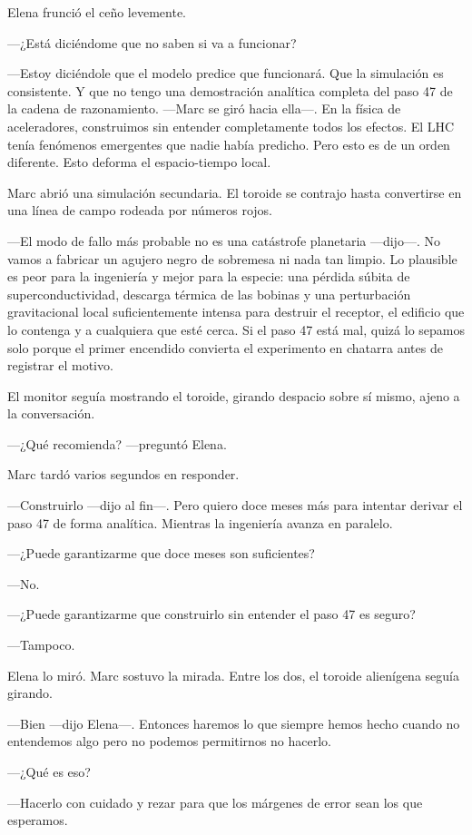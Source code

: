 \documentclass[11pt,a5paper,twoside]{book}
\begin{document}
Elena frunció el ceño levemente.

—¿Está diciéndome que no saben si va a funcionar?

—Estoy diciéndole que el modelo predice que funcionará. Que la simulación es consistente. Y que no tengo una demostración analítica completa del paso 47 de la cadena de razonamiento. —Marc se giró hacia ella—. En la física de aceleradores, construimos sin entender completamente todos los efectos. El LHC tenía fenómenos emergentes que nadie había predicho. Pero esto es de un orden diferente. Esto deforma el espacio-tiempo local.

Marc abrió una simulación secundaria. El toroide se contrajo hasta convertirse en una línea de campo rodeada por números rojos.

—El modo de fallo más probable no es una catástrofe planetaria —dijo—. No vamos a fabricar un agujero negro de sobremesa ni nada tan limpio. Lo plausible es peor para la ingeniería y mejor para la especie: una pérdida súbita de superconductividad, descarga térmica de las bobinas y una perturbación gravitacional local suficientemente intensa para destruir el receptor, el edificio que lo contenga y a cualquiera que esté cerca. Si el paso 47 está mal, quizá lo sepamos solo porque el primer encendido convierta el experimento en chatarra antes de registrar el motivo.

El monitor seguía mostrando el toroide, girando despacio sobre sí mismo, ajeno a la conversación.

—¿Qué recomienda? —preguntó Elena.

Marc tardó varios segundos en responder.

—Construirlo —dijo al fin—. Pero quiero doce meses más para intentar derivar el paso 47 de forma analítica. Mientras la ingeniería avanza en paralelo.

—¿Puede garantizarme que doce meses son suficientes?

—No.

—¿Puede garantizarme que construirlo sin entender el paso 47 es seguro?

—Tampoco.

Elena lo miró. Marc sostuvo la mirada. Entre los dos, el toroide alienígena seguía girando.

—Bien —dijo Elena—. Entonces haremos lo que siempre hemos hecho cuando no entendemos algo pero no podemos permitirnos no hacerlo.

—¿Qué es eso?

—Hacerlo con cuidado y rezar para que los márgenes de error sean los que esperamos.
\end{document}
